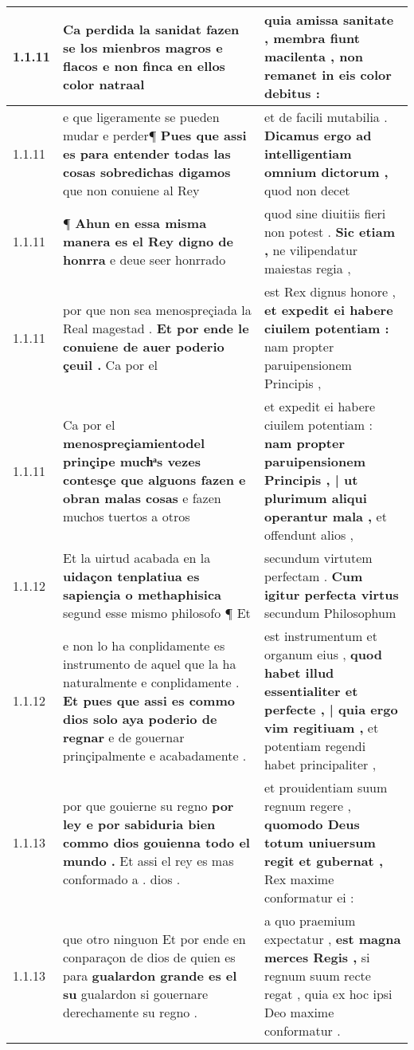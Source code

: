 \begin{tabular}{|p{1cm}|p{6.5cm}|p{6.5cm}|}
1.1.11 & Ca perdida la sanidat \textbf{ fazen se los mienbros magros e flacos } e non finca en ellos color natraal & quia amissa sanitate , \textbf{ membra fiunt macilenta , } non remanet in eis color debitus : \\\hline
1.1.11 & e que ligeramente se pueden mudar e perder¶ \textbf{ Pues que assi es para entender todas las cosas sobredichas digamos } que non conuiene al Rey & et de facili mutabilia . \textbf{ Dicamus ergo ad intelligentiam omnium dictorum , } quod non decet \\\hline
1.1.11 & ¶ \textbf{ Ahun en essa misma manera es el Rey digno de honrra } e deue seer honrrado & quod sine diuitiis fieri non potest . \textbf{ Sic etiam , } ne vilipendatur maiestas regia , \\\hline
1.1.11 & por que non sea menospreçiada la Real magestad . \textbf{ Et por ende le conuiene de auer poderio çeuil . } Ca por el & est Rex dignus honore , \textbf{ et expedit ei habere ciuilem potentiam : } nam propter paruipensionem Principis , \\\hline
1.1.11 & Ca por el \textbf{ menospreçiamientodel prinçipe muchͣs vezes contesçe que alguons fazen e obran malas cosas } e fazen muchos tuertos a otros & et expedit ei habere ciuilem potentiam : \textbf{ nam propter paruipensionem Principis , | ut plurimum aliqui operantur mala , } et offendunt alios , \\\hline
1.1.12 & Et la uirtud acabada en la \textbf{ uidaçon tenplatiua es sapiençia o methaphisica } segund esse mismo philosofo ¶ Et & secundum virtutem perfectam . \textbf{ Cum igitur perfecta virtus } secundum Philosophum \\\hline
1.1.12 & e non lo ha conplidamente es instrumento de aquel que la ha naturalmente e conplidamente . \textbf{ Et pues que assi es commo dios solo aya poderio de regnar } e de gouernar prinçipalmente e acabadamente . & est instrumentum et organum eius , \textbf{ quod habet illud essentialiter et perfecte , | quia ergo vim regitiuam , } et potentiam regendi habet principaliter , \\\hline
1.1.13 & por que gouierne su regno \textbf{ por ley e por sabiduria bien commo dios gouienna todo el mundo . } Et assi el rey es mas conformado a . dios . & et prouidentiam suum regnum regere , \textbf{ quomodo Deus totum uniuersum regit et gubernat , } Rex maxime conformatur ei : \\\hline
1.1.13 & que otro ninguon Et por ende en conparaçon de dios de quien es para \textbf{ gualardon grande es el su } gualardon si gouernare derechamente su regno . & a quo praemium expectatur , \textbf{ est magna merces Regis , } si regnum suum recte regat , quia ex hoc ipsi Deo maxime conformatur . \\\hline

\end{tabular}
